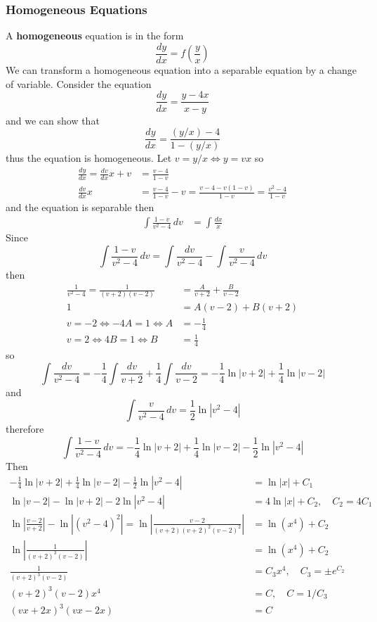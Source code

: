 \subsubsection{Homogeneous Equations}
A \textbf{homogeneous} equation is in the form
\[\frac{dy}{dx}=f\left(\frac{y}{x}\right)\]
We can transform a homogeneous equation into a separable equation by a change
of variable.
Consider the equation
\[\frac{dy}{dx}=\frac{y-4x}{x-y}\]
and we can show that
\[\frac{dy}{dx}=\frac{(y/x)-4}{1-(y/x)}\]
thus the equation is homogeneous.
Let \(v=y/x\iff y=vx\) so
\begin{align*}
    \frac{dy}{dx}=\frac{dv}{dx}x+v &= \frac{v-4}{1-v} \\
    \frac{dv}{dx}x
    &= \frac{v-4}{1-v}-v=\frac{v-4-v(1-v)}{1-v}=\frac{v^2-4}{1-v}
\end{align*}
and the equation is separable then
\begin{align*}
    \int\frac{1-v}{v^2-4}\,dv &= \int\frac{dx}{x}
\end{align*}
Since
\[\int\frac{1-v}{v^2-4}\,dv=\int\frac{dv}{v^2-4}-\int\frac{v}{v^2-4}\,dv\]
then
\begin{align*}
    \frac{1}{v^2-4}=\frac{1}{(v+2)(v-2)} &= \frac{A}{v+2}+\frac{B}{v-2} \\
    1 &= A(v-2)+B(v+2) \\
    v=-2\iff -4A=1\iff A &= -\frac{1}{4} \\
    v=2\iff 4B=1\iff B &= \frac{1}{4}
\end{align*}
so
\[\int\frac{dv}{v^2-4}
=-\frac{1}{4}\int\frac{dv}{v+2}+\frac{1}{4}\int\frac{dv}{v-2}
=-\frac{1}{4}\ln|v+2|+\frac{1}{4}\ln|v-2|\]
and
\[\int\frac{v}{v^2-4}\,dv=\frac{1}{2}\ln|v^2-4|\]
therefore
\[\int\frac{1-v}{v^2-4}\,dv
=-\frac{1}{4}\ln|v+2|+\frac{1}{4}\ln|v-2|-\frac{1}{2}\ln|v^2-4|\]
Then
\begin{align*}
    -\frac{1}{4}\ln|v+2|+\frac{1}{4}\ln|v-2|-\frac{1}{2}\ln|v^2-4|
    &= \ln|x|+C_1 \\
    \ln|v-2|-\ln|v+2|-2\ln|v^2-4| &= 4\ln|x|+C_2,\quad C_2=4C_1 \\
    \ln\left|\frac{v-2}{v+2}\right|-\ln|(v^2-4)^2|
    =\ln\left|\frac{v-2}{(v+2)(v+2)^2(v-2)^2}\right| &= \ln(x^4)+C_2 \\
    \ln\left|\frac{1}{(v+2)^3(v-2)}\right| &= \ln(x^4)+C_2 \\
    \frac{1}{(v+2)^3(v-2)} &= C_3x^4,\quad C_3=\pm e^{C_2} \\
    (v+2)^3(v-2)x^4 &= C,\quad C=1/C_3 \\
    (vx+2x)^3(vx-2x) &= C
\end{align*}
